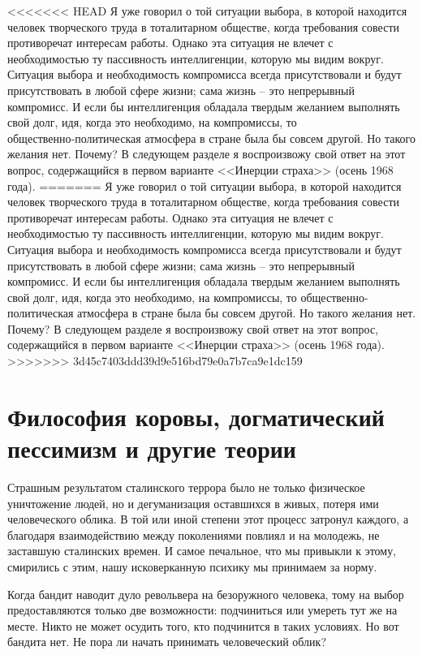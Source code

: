 \documentclass{book}
\begin{document}
<<<<<<< HEAD
Я уже говорил о той ситуации выбора, в которой находится человек творческого труда в тоталитарном обществе, когда требования совести противоречат интересам работы. Однако эта ситуация не влечет с необходимостью ту пассивность интеллигенции, которую мы видим вокруг. Ситуация выбора и необходимость компромисса всегда присутствовали и будут присутствовать в любой сфере жизни; сама жизнь -- это непрерывный компромисс. И если бы интеллигенция обладала твердым желанием выполнять свой долг, идя, когда это необходимо, на компромиссы, то общественно‑политическая атмосфера в стране была бы совсем другой. Но такого желания нет. Почему? В следующем разделе я воспроизвожу свой ответ на этот вопрос, содержащийся в первом варианте <<Инерции страха>> (осень 1968 года).
=======
Я уже говорил о той ситуации выбора, в которой находится человек творческого труда в тоталитарном обществе, когда требования совести противоречат интересам работы. Однако эта ситуация не влечет с необходимостью ту пассивность интеллигенции, которую мы видим вокруг. Ситуация выбора и необходимость компромисса всегда присутствовали и будут присутствовать в любой сфере жизни; сама жизнь -- это непрерывный компромисс. И если бы интеллигенция обладала твердым желанием выполнять свой долг, идя, когда это необходимо, на компромиссы, то общественно-политическая атмосфера в стране была бы совсем другой. Но такого желания нет. Почему? В следующем разделе я воспроизвожу свой ответ на этот вопрос, содержащийся в первом варианте <<Инерции страха>> (осень 1968 года).
>>>>>>> 3d45c7403ddd39d9e516bd79e0a7b7ca9e1dc159


\section{Философия коровы, догматический пессимизм и другие теории}

Страшным результатом сталинского террора было не только физическое уничтожение людей, но и дегуманизация оставшихся в живых, потеря ими человеческого облика. В той или иной степени этот процесс затронул каждого, а благодаря взаимодействию между поколениями повлиял и на молодежь, не заставшую сталинских времен. И самое печальное, что мы привыкли к этому, смирились с этим, нашу исковерканную психику мы принимаем за норму.

Когда бандит наводит дуло револьвера на безоружного че­ловека, тому на выбор предоставляются только две возмож­ности: подчиниться или умереть тут же на месте. Никто не может осудить того, кто подчинится в таких условиях. Но вот бандита нет. Не пора ли начать принимать человеческий облик?
\end{document}
